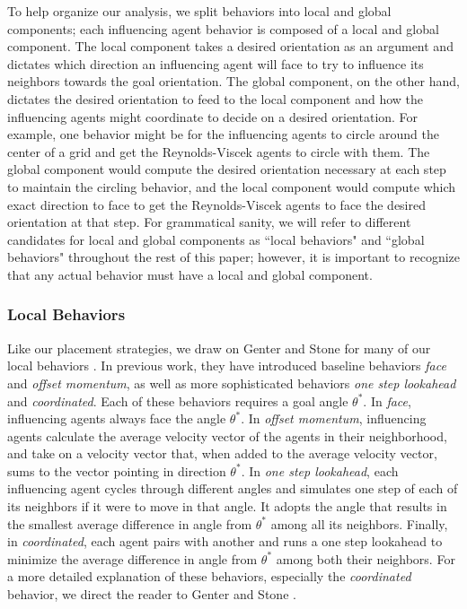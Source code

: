 To help organize our analysis, we split behaviors into local and global
components; each influencing agent behavior is composed of a local and global
component.
The local component takes a desired orientation as an argument and dictates
which direction an influencing agent will face to try to influence its neighbors
towards the goal orientation.
The global component, on the other hand, dictates the desired orientation to
feed to the local component and how the influencing agents might coordinate to
decide on a desired orientation.
For example, one behavior might be for the influencing agents to circle around
the center of a grid and get the Reynolds-Viscek agents to circle with them.
The global component would compute the desired orientation necessary at each
step to maintain the circling behavior, and the local component would compute
which exact direction to face to get the Reynolds-Viscek agents to face the
desired orientation at that step.
For grammatical sanity, we will refer to different candidates for local and
global components as ``local behaviors" and ``global behaviors" throughout the
rest of this paper; however, it is important to recognize that any actual
behavior must have a local and global component.

\subsubsection*{Local Behaviors}
Like our placement strategies, we draw on Genter and Stone for many of our
local behaviors \cite{genter201612steplookahead,genter2016facegoalfacecurrent,
genter2015placement}.
In previous work, they have introduced baseline behaviors \textit{face} and
\textit{offset momentum}, as well as more sophisticated behaviors \textit{one
step lookahead} and \textit{coordinated}.
Each of these behaviors requires a goal angle $\theta^*$.
In \textit{face}, influencing agents always face the angle $\theta^*$.
In \textit{offset momentum}, influencing agents calculate the average velocity
vector of the agents in their neighborhood, and take on a velocity vector that,
when added to the average velocity vector, sums to the vector pointing in
direction $\theta^*$.
In \textit{one step lookahead}, each influencing agent cycles through different
angles and simulates one step of each of its neighbors if it were to move in
that angle.
It adopts the angle that results in the smallest average difference in angle
from $\theta^*$ among all its neighbors.
Finally, in \textit{coordinated}, each agent pairs with another and runs a one
step lookahead to minimize the average difference in angle from $\theta^*$
among both their neighbors.
For a more detailed explanation of these behaviors, especially the
\textit{coordinated} behavior, we direct the reader to Genter and Stone
\cite{genter201612steplookahead}.


